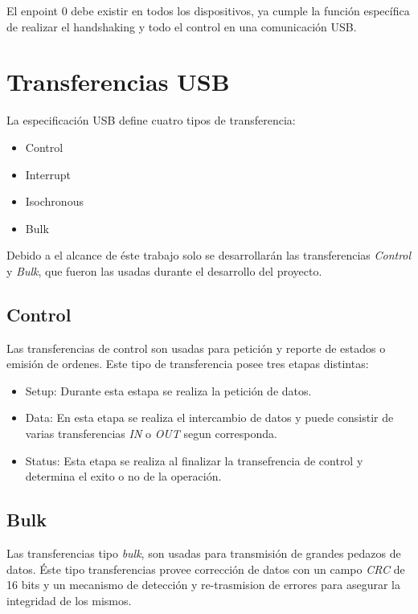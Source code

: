 El enpoint 0 debe existir en todos los dispositivos, ya cumple la funci\'on
espec\'ifica de realizar el handshaking y todo el control en una
comunicaci\'on USB. 


\clearpage
\section{Transferencias USB}
La especificaci\'on USB define cuatro tipos de transferencia:

\begin{itemize}
 \item Control
 \item Interrupt
 \item Isochronous 
 \item Bulk
\end{itemize}

Debido a el alcance de \'este trabajo solo se desarrollar\'an las
transferencias \emph{Control} y \emph{Bulk}, que fueron las usadas durante el
desarrollo del proyecto.


\subsection{Control}
Las transferencias de control son usadas para petici\'on y reporte de estados o
emisi\'on de ordenes. Este tipo de transferencia posee tres etapas distintas:

\begin{itemize}
 \item Setup:
		Durante esta estapa se realiza la petici\'on de datos.
 \item Data:
		En esta etapa se realiza el intercambio de datos y puede consistir de
varias transferencias \emph{IN} o \emph{OUT} segun corresponda. 
 \item Status:
		Esta etapa se realiza al finalizar la transefrencia de control y
determina el exito o no de la operaci\'on.
\end{itemize}


\subsection{Bulk}
Las transferencias tipo \emph{bulk}, son usadas para transmisi\'on de grandes
pedazos de datos. \'Este tipo transferencias provee correcci\'on de datos
con un campo \emph{CRC} de 16 bits y un mecanismo de detecci\'on y
re-trasmision de errores para asegurar la integridad de los mismos.\\

